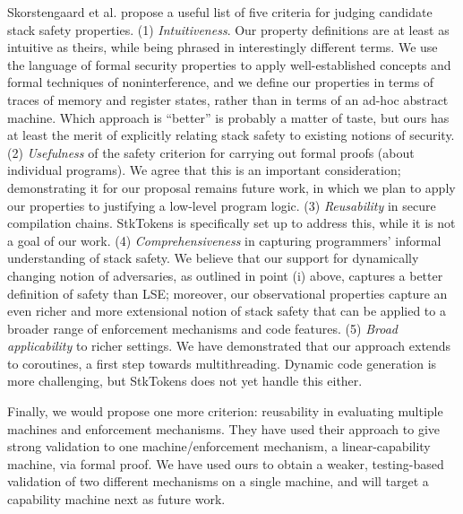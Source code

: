 \documentclass[10pt,conference]{ieeetran}%
\theoremstyle{definition}
\begin{document}
{Skorstengaard et al. \cite{SkorstengaardSTKJFP} propose a useful list of five criteria for judging
candidate stack safety properties.
%
(1) {\em Intuitiveness}. Our property definitions are at least as
intuitive as theirs, while being phrased in interestingly different terms.
We use the language of formal security
properties to apply well-established concepts and formal techniques
of noninterference, and we define our properties in terms of
traces of memory and register states, rather than in terms of an
ad-hoc abstract machine.
Which approach is ``better'' is probably a matter of taste, but ours
has at least the merit of explicitly relating stack safety to existing
notions of security.
%
(2) {\em Usefulness} of the safety criterion
for carrying out formal proofs (about individual programs). We agree that this is an important consideration;
demonstrating it for our proposal remains future work, in which we
plan to apply our properties to justifying a low-level program logic.
%
(3) {\em Reusability} in secure compilation chains.
StkTokens is specifically set up to address this,
while it is not a goal of our work.
%
(4) {\em Comprehensiveness} in capturing programmers' informal
understanding of stack safety. We believe that our support
for dynamically changing notion of adversaries, as outlined in point (i) above,
captures a better definition of safety than LSE; moreover, our observational
properties capture an even richer and more extensional notion of stack safety
that can be applied to a broader range of enforcement mechanisms and code features.
%
(5) {\em Broad applicability} to richer settings. We have demonstrated that our approach extends to
coroutines, a first step towards multithreading. Dynamic code generation is
more challenging, but StkTokens does not yet handle this either.

Finally, we would propose one more criterion: reusability in evaluating multiple machines and
enforcement mechanisms. They have used their approach to give strong validation
to one machine/enforcement mechanism, a linear-capability machine,
via formal proof. We have used ours to obtain a weaker, testing-based validation of
two different mechanisms on a single machine, and will target a capability machine
next as future work.

}
\end{document}
